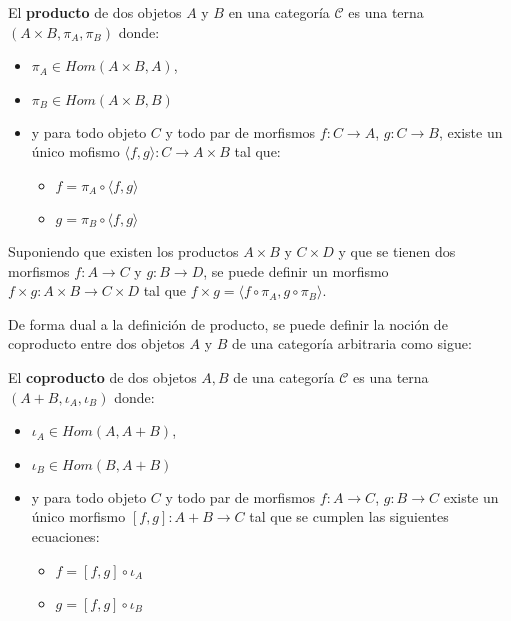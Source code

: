\begin{definition}[Producto]
El \textbf{producto} de dos objetos $A$ y $B$ en una categoría $\mathscr{C}$ es una terna $(A \times B, \pi_A, \pi_B)$ donde:
\begin{itemize}[label=$\blacktriangleright$]
	\item $\pi_A \in Hom(A \times B, A)$,
	\item $\pi_B \in Hom(A \times B, B)$
	\item y para todo objeto $C$ y todo par de morfismos $f : C \rightarrow A$, $g : C \rightarrow B$, existe un único mofismo $\langle f, g \rangle : C \rightarrow A \times B$ tal que:
	\begin{itemize}[label=$\bullet$]
		\item $f = \pi_A \circ \langle f, g \rangle$
		\item $g = \pi_B \circ \langle f, g \rangle$
	\end{itemize}
\end{itemize}
\end{definition}

Suponiendo que existen los productos $A \times B$ y $C \times D$ y que se tienen dos morfismos $f : A \rightarrow C$ y $g : B \rightarrow D$, se puede definir un morfismo $f \times g : A \times B \rightarrow C \times D$ tal que $f \times g = \langle f \circ \pi_A , g \circ \pi_B \rangle$.

De forma dual a la definición de producto, se puede definir la noción de coproducto entre dos objetos $A$ y $B$ de una categoría arbitraria como sigue:

\begin{definition}[Coproducto]
El \textbf{coproducto} de dos objetos $A, B$ de una categoría $\mathscr{C}$ es una terna $(A + B, \iota_A, \iota_B)$ donde:
\begin{itemize}[label=$\blacktriangleright$]
	\item $\iota_A \in Hom(A, A + B)$,
	\item $\iota_B \in Hom(B, A + B)$
	\item y para todo objeto $C$ y todo par de morfismos $f : A \rightarrow C$, $g : B \rightarrow C$ existe un único morfismo $[f,g] : A + B \rightarrow C$ tal que se cumplen las siguientes ecuaciones:
	\begin{itemize}[label=$\bullet$]
		\item $f = [f,g] \circ \iota_A$
		\item $g = [f,g] \circ \iota_B$
	\end{itemize}
\end{itemize}
\end{definition}

